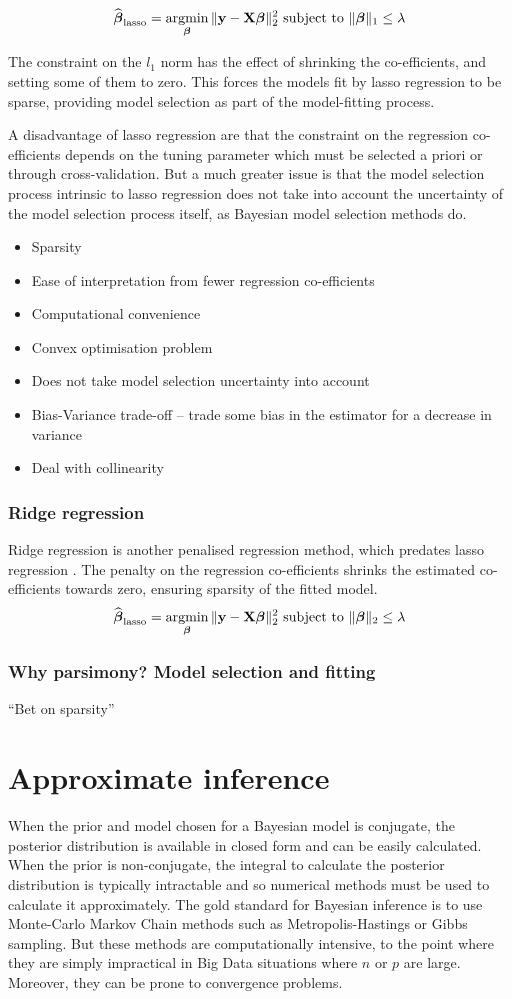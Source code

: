 $$
\widehat{\vbeta}_{\text{lasso}} = \argmin_\vbeta \|\vy - \mX \vbeta\|_2^2 \text{ subject to } \|\vbeta\|_1 \leq \lambda
$$

The constraint on the $l_1$ norm has the effect of shrinking the co-efficients, and setting some of them to
zero. This forces the models fit by lasso regression to be sparse, providing model selection as part of the
model-fitting process.

A disadvantage of lasso regression are that the constraint on the regression co-efficients depends on the
tuning parameter which must be selected a priori or through cross-validation. But a much greater issue is that
the model selection process intrinsic to lasso regression does not take into account the uncertainty of the
model selection process itself, as Bayesian model selection methods do.

\begin{itemize}
\item Sparsity
\item Ease of interpretation from fewer regression co-efficients
\item Computational convenience
\item Convex optimisation problem
\item Does not take model selection uncertainty into account
\item Bias-Variance trade-off -- trade some bias in the estimator for a decrease in variance
\item Deal with collinearity
\end{itemize}

\subsubsection{Ridge regression}
Ridge regression is another penalised regression method, which predates lasso regression
\cite{Hoerl2017}. The penalty on the regression co-efficients shrinks the estimated co-efficients towards
zero, ensuring sparsity of the fitted model.
$$
\widehat{\vbeta}_{\text{lasso}} = \argmin_\vbeta \|\vy - \mX \vbeta\|_2^2 \text{ subject to } \|\vbeta\|_2 \leq \lambda
$$
\subsubsection{Why parsimony? Model selection and fitting}
``Bet on sparsity''
\citep{Hastie2015}

\section{Approximate inference}
When the prior and model chosen for a Bayesian model is conjugate, the posterior distribution is available in
closed form and can be easily calculated.
When the prior is non-conjugate, the integral to calculate the posterior distribution is typically intractable
and so numerical methods must be used to calculate it approximately.
The gold standard for Bayesian inference is to use Monte-Carlo Markov Chain methods such as Metropolis-Hastings
or Gibbs sampling. But these methods are computationally intensive, to the point where they are simply
impractical in Big Data situations where $n$ or $p$ are large. Moreover, they can be prone to convergence 
problems.


